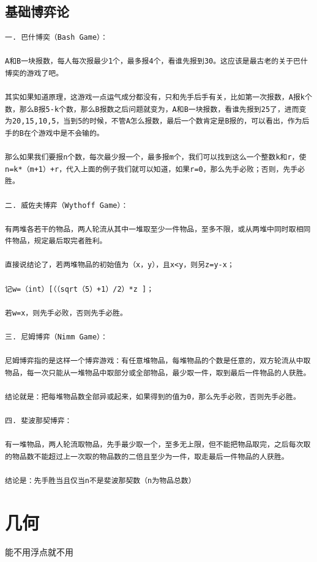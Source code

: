 \documentclass[12pt, a4paper, oneside]{ctexart}
\begin{document}
\newpage 
\subsection{基础博弈论} 
\begin{lstlisting}
一. 巴什博奕（Bash Game）：

A和B一块报数，每人每次报最少1个，最多报4个，看谁先报到30。这应该是最古老的关于巴什博奕的游戏了吧。

其实如果知道原理，这游戏一点运气成分都没有，只和先手后手有关，比如第一次报数，A报k个数，那么B报5-k个数，那么B报数之后问题就变为，A和B一块报数，看谁先报到25了，进而变为20,15,10,5，当到5的时候，不管A怎么报数，最后一个数肯定是B报的，可以看出，作为后手的B在个游戏中是不会输的。

那么如果我们要报n个数，每次最少报一个，最多报m个，我们可以找到这么一个整数k和r，使n=k*（m+1）+r，代入上面的例子我们就可以知道，如果r=0，那么先手必败；否则，先手必胜。

二. 威佐夫博弈（Wythoff Game）：

有两堆各若干的物品，两人轮流从其中一堆取至少一件物品，至多不限，或从两堆中同时取相同件物品，规定最后取完者胜利。

直接说结论了，若两堆物品的初始值为（x，y），且x<y，则另z=y-x；

记w=（int）[（（sqrt（5）+1）/2）*z ]；

若w=x，则先手必败，否则先手必胜。

三. 尼姆博弈（Nimm Game）：

尼姆博弈指的是这样一个博弈游戏：有任意堆物品，每堆物品的个数是任意的，双方轮流从中取物品，每一次只能从一堆物品中取部分或全部物品，最少取一件，取到最后一件物品的人获胜。

结论就是：把每堆物品数全部异或起来，如果得到的值为0，那么先手必败，否则先手必胜。

四. 斐波那契博弈：

有一堆物品，两人轮流取物品，先手最少取一个，至多无上限，但不能把物品取完，之后每次取的物品数不能超过上一次取的物品数的二倍且至少为一件，取走最后一件物品的人获胜。

结论是：先手胜当且仅当n不是斐波那契数（n为物品总数）
\end{lstlisting}

\newpage 
\section{几何}
能不用浮点就不用 
\end{document}
